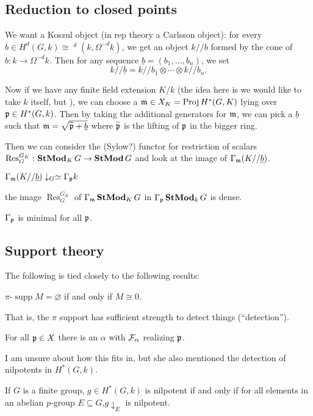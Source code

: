 \documentclass[12pt]{article}
\newcommand{\p}{\frakp}
\newcommand{\m}{\frakm}
\DeclareMathOperator{\supp}{supp}
\DeclareMathOperator{\uHom}{\underline{Hom}}
\begin{document}
\subsection{Reduction to closed points}
We want a Koszul object (in rep theory a Carlsson object): for every $b\in H^d(G,k)\cong\uHom^d(k,\Omega^{-d}k)$, we get an object
$k//b$ formed by the cone of $b:k\to\Omega^{-d}k$. Then for any sequence $\underline{b}=(b_1,\dots,b_n)$, we set 
\[k//\underline{b}=k//b_1\otimes\cdots\otimes k//b_n.\]

Now if we have any finite field extension $K/k$ (the idea here is we would like to take $k$ itself, but ), we can choose a $\m\in X_K=\operatorname{Proj}H^\ast(G,K)$ lying over $\p\in H^\ast(G,k)$.
Then by taking the additional generators for $\m$, we can pick a $\underline b$ such that $\m=\sqrt{\tilde\p+\underline b}$ where $\tilde\p$ is the lifting of $\p$ in the bigger ring.

Then we can consider the (Sylow?) functor for restriction of scalars $\operatorname{Res}^{G_K}_G:\operatorname{\mathbf{StMod}}_K G\to \operatorname{\mathbf{StMod}} G$
and look at the image of $\Gamma_\m(K//\underline b)$.
\begin{lem}
	$\Gamma_\m(K//\underline b)\downarrow_G\simeq \Gamma_\p k$
\end{lem}
\begin{cor}
	the image $\operatorname{Res}_G^{G_K}$ of $\Gamma_\m\StMod_K G$ in $\Gamma_\p\StMod_k G$ is dense.
\end{cor}
\begin{cor}
	$\Gamma_\p$ is minimal for all $\p$.
\end{cor}

\subsection{Support theory}
The following is tied closely to the following results:
\begin{prop}
	$\pi$-$\supp M=\varnothing$ if and only if $M\cong 0$.

	That is, the $\pi$ support has sufficient strength to detect things (``detection'').
\end{prop}
\begin{prop}
	For all $\p\in X$ there is an $\alpha$ with $\mathcal{F}_\alpha$ realizing $\p$.
\end{prop}

I am unsure about how this fits in, but she also mentioned the detection of nilpotents in $H^\ast(G,k)$.
\begin{thm}[Quillen '71]
	If $G$ is a finite group, $g\in H^\ast(G,k)$ is nilpotent if and only if for all elements in an abelian $p$-group $E\subseteq G$,$g\downarrow_E$ is nilpotent.
\end{thm}
\end{document}
